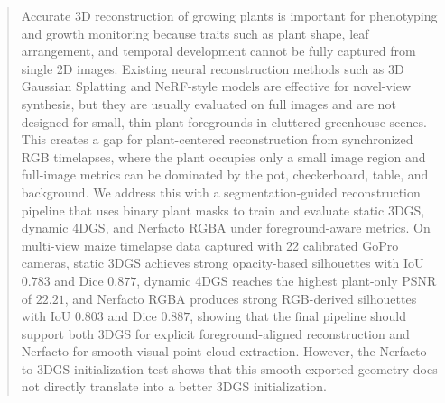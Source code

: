 \documentclass[sigconf]{acmart}
\begin{document}
\begin{abstract}
Accurate 3D reconstruction of growing plants is important for phenotyping and growth monitoring because traits such as plant shape, leaf arrangement, and temporal development cannot be fully captured from single 2D images. Existing neural reconstruction methods such as 3D Gaussian Splatting and NeRF-style models are effective for novel-view synthesis, but they are usually evaluated on full images and are not designed for small, thin plant foregrounds in cluttered greenhouse scenes. This creates a gap for plant-centered reconstruction from synchronized RGB timelapses, where the plant occupies only a small image region and full-image metrics can be dominated by the pot, checkerboard, table, and background. We address this with a segmentation-guided reconstruction pipeline that uses binary plant masks to train and evaluate static 3DGS, dynamic 4DGS, and Nerfacto RGBA under foreground-aware metrics. On multi-view maize timelapse data captured with 22 calibrated GoPro cameras, static 3DGS achieves strong opacity-based silhouettes with IoU $0.783$ and Dice $0.877$, dynamic 4DGS reaches the highest plant-only PSNR of $22.21$, and Nerfacto RGBA produces strong RGB-derived silhouettes with IoU $0.803$ and Dice $0.887$, showing that the final pipeline should support both 3DGS for explicit foreground-aligned reconstruction and Nerfacto for smooth visual point-cloud extraction. However, the Nerfacto-to-3DGS initialization test shows that this smooth exported geometry does not directly translate into a better 3DGS initialization.
\end{abstract}
\end{document}
